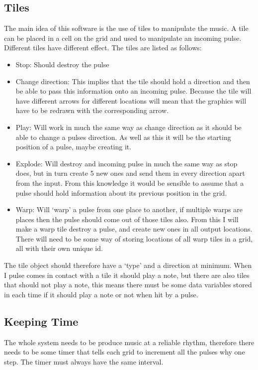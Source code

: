 \documentclass[10pt,a4paper]{article}
\begin{document}
\subsection{Tiles}
The main idea of this software is the use of tiles to manipulate the music. A tile can be placed in a cell on the grid and used to manipulate an incoming pulse. Different tiles have different effect. The tiles are listed as follows:
\begin{itemize}
\item    Stop: Should destroy the pulse

\item Change direction: This implies that the tile should hold a direction and then be able to pass this information onto an incoming pulse. Because the tile will have different arrows for different locations will mean that the graphics will have to be redrawn with the corresponding arrow.

\item Play: Will work in much the same way as change direction as it should be able to change a pulses direction. As well as this it will be the starting position of a pulse, maybe creating it.

\item Explode: Will destroy and incoming pulse in much the same way as stop does, but in turn create 5 new ones and send them in every direction apart from the input. From this knowledge it would be sensible to assume that a pulse should hold information about its previous position in the grid.

\item Warp: Will ‘warp’ a pulse from one place to another,  if multiple warps are places then the pulse should come out of those tiles also. From this I will make a warp tile destroy a pulse, and create new ones in all output locations. There will need to be some way of storing locations of all warp tiles in a grid, all with their own unique id.
\end{itemize}

The tile object should therefore have a ‘type’ and a direction at minimum. When I pulse comes in contact with a tile it should play a note, but there are also tiles that should not play a note, this means there must be some data variables stored in each time if it should play a note or not when hit by a pulse.

\subsection{Keeping Time}
The whole system needs to be produce music at a reliable rhythm, therefore there needs to be some timer that tells each grid to increment all the pulses why one step. The timer must always have the same interval.
\end{document}
